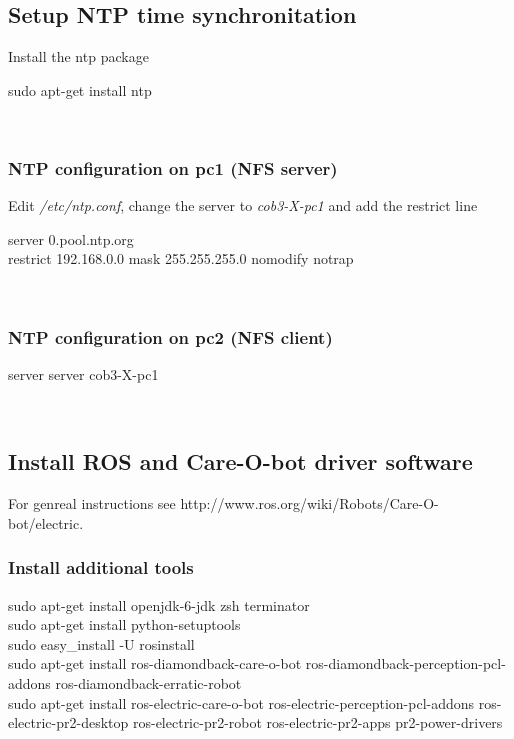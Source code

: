 \subsection{Setup NTP time synchronitation}
Install the ntp package

\colorbox{light-gray}{
\begin{minipage}{1.0\textwidth}
	sudo apt-get install ntp
\end{minipage} } \\

\subsubsection{NTP configuration on pc1 (NFS server)}
Edit \textit{/etc/ntp.conf}, change the server to \textit{cob3-X-pc1} and add the restrict line

\colorbox{light-gray}{
\begin{minipage}{1.0\textwidth} 
	server 0.pool.ntp.org \\
	restrict 192.168.0.0 mask 255.255.255.0 nomodify notrap
\end{minipage} } \\

\subsubsection{NTP configuration on pc2 (NFS client)}

\colorbox{light-gray}{
\begin{minipage}{1.0\textwidth} 
	server server cob3-X-pc1
\end{minipage} } \\

\subsection{Install ROS and Care-O-bot driver software}
For genreal instructions see http://www.ros.org/wiki/Robots/Care-O-bot/electric.

\subsubsection{Install additional tools}
\colorbox{light-gray}{
\begin{minipage}{1.0\textwidth} 
	sudo apt-get install openjdk-6-jdk zsh terminator\\
	sudo apt-get install python-setuptools\\
	sudo easy\_install -U rosinstall\\
	sudo apt-get install ros-diamondback-care-o-bot ros-diamondback-perception-pcl-addons ros-diamondback-erratic-robot\\
	sudo apt-get install ros-electric-care-o-bot ros-electric-perception-pcl-addons ros-electric-pr2-desktop ros-electric-pr2-robot ros-electric-pr2-apps pr2-power-drivers
\end{minipage} } \\


